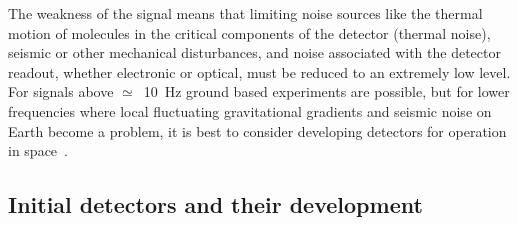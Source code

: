   The weakness of the signal means that limiting noise sources like the thermal
motion of molecules in the critical components of the detector (thermal noise),
seismic or other mechanical disturbances, and noise associated with the detector
readout, whether electronic or optical, must be reduced to an extremely low
level. For signals above $\simeq$~10~Hz ground based experiments are possible,
but for lower frequencies where local fluctuating gravitational gradients and
seismic noise on Earth become a problem, it is best to consider developing
detectors for operation in space~\cite{LISA}.


\subsection{Initial detectors and their development}
\label{subsection:initdet} 


